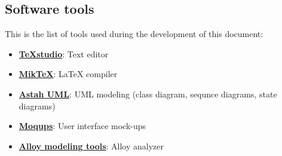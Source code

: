 \subsection{Software tools}
This is the list of tools used during the development of this document:
\begin{itemize}[itemsep=-1mm, topsep=-1mm]
	\item \textbf{\href{https://www.texstudio.org/}{TeXstudio}}: Text editor
	\item \textbf{\href{https://miktex.org/}{MikTeX}}: LaTeX compiler
	\item \textbf{\href{https://astah.net/}{Astah UML}}: UML modeling (class diagram, sequnce diagrams, state diagrams)
	\item \textbf{\href{https://moqups.com/}{Moqups}}: User interface mock-ups
	\item \textbf{\href{http://alloytools.org/}{Alloy modeling tools}}: Alloy analyzer
\end{itemize}